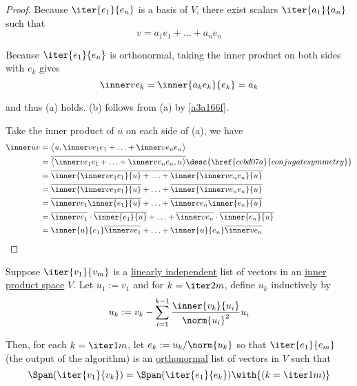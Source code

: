 \begin{proof}
  \def\i#1{\inner v{e_{#1}}}
  Because $\iter{e_1}{e_n}$ is a basis of $V$, there exist scalars
  $\iter{a_1}{a_n}$ such that
  $$
    v=a_1e_1+\ldots+a_ne_n
  $$

  Because $\iter{e_1}{e_n}$ is orthonormal, taking the inner product on both
  sides with $e_k$ gives
  $$
    \inner v{e_k}=\inner{a_ke_k}{e_k}=a_k
  $$

  and thus (a) holds. (b) follows from (a) by \autoref{a3a166f}.

  Take the inner product of $u$ on each side of (a), we have
  \begin{align*}
    \inner uv &=\big\langle u,\i1e_1+\ldots+\i ne_n\big\rangle                                                    \\
              &=\overline{\big\langle\i1e_1+\ldots+\i ne_n,u\big\rangle}\desc{\href{cebd07a}{conjugate symmetry}} \\
              &=\overline{\inner{\i1e_1}{u}+\ldots+\inner{\i ne_n}{u}}                                            \\
              &=\overline{\inner{\i1e_1}{u}}+\ldots+\overline{\inner{\i ne_n}{u}}                                 \\
              &=\overline{\i1\inner{e_1}{u}}+\ldots+\overline{\i n\inner{e_n}{u}}                                 \\
              &=\overline{\i1}\cdot\overline{\inner{e_1}{u}}+\ldots+\overline{\i n}\cdot\overline{\inner{e_n}{u}} \\
              &=\inner{u}{e_1}\overline{\i1}+\ldots+\inner{u}{e_n}\overline{\i n}
  \end{align*}
\end{proof}

\label{ee6ac50}

Suppose $\iter{v_1}{v_m}$ is a \href{c133a44}{linearly independent} list of
vectors in an \href{b9935c8}{inner product space} $V$. Let $u_1:=v_1$ and for
$k=\iter2m$, define $u_k$ inductively by
$$
  u_k:=v_k-\sum_{i=1}^{k-1}\frac{\inner{v_k}{u_i}}{\norm{u_i}^2}u_i
$$

Then, for each $k=\iter1m$, let $e_k:=u_k/\norm{u_k}$ so that $\iter{e_1}{e_m}$
(the output of the algorithm) is an \href{d90fcb1}{orthonormal} list of vectors
in $V$ such that
$$
  \Span(\iter{v_1}{v_k})=\Span(\iter{e_1}{e_k})\with{(k=\iter1m)}
$$

